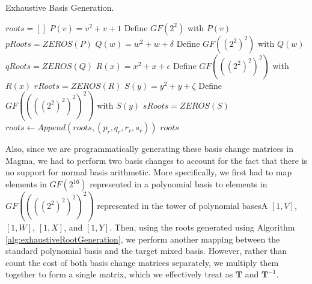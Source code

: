 \begin{algorithm}[t] %
\caption{Exhaustive Basis Generation.} \label{alg:exhaustiveRootGeneration}
\begin{algorithmic}[1]
	\State $roots = []$
	\State $P(v) = v^2 + v + 1$
	\State Define $GF(2^2)$ with $P(v)$
	\State $pRoots = ZEROS(P)$
		\State $Q(w) = w^2 + w + \delta$
			\State Define $GF((2^2)^2)$ with $Q(w)$
			\State $qRoots = ZEROS(Q)$
				\State $R(x) = x^2 + x + \epsilon$
					\State Define $GF(((2^2)^2)^2)$ with $R(x)$
					\State $rRoots = ZEROS(R)$
						\State $S(y) = y^2 + y + \zeta$
							\State Define $GF((((2^2)^2)^2)^2)$ with $S(y)$
							\State $sRoots = ZEROS(S)$
								\State $roots \gets Append(roots, (p_r,q_r,r_r,s_r))$
							\EndFor
						\EndIf
					\EndFor
				\EndIf
			\EndFor
		\EndIf
	\EndFor
	\State \Return $roots$
\end{algorithmic}
\end{algorithm}

Also, since we are programmatically generating these basis change matrices in Magma, we had to perform two basis changes to account for the fact that there is no support for normal basis arithmetic. More specifically, we first had to map elements in $GF(2^{16})$ represented in a polynomial basis to elements in $GF((((2^2)^2)^2)^2)$ represented in the tower of polynomial basesA $[1, V]$, $[1, W]$, $[1, X]$, and $[1, Y]$. Then, using the roots generated using Algorithm \ref{alg:exhaustiveRootGeneration}, we perform another mapping between the standard polynomial basis and the target mixed basis. However, rather than count the cost of both basis change matrices separately, we multiply them together to form a single matrix, which we effectively treat as $\mathbf{T}$ and $\mathbf{T}^{-1}$. 


